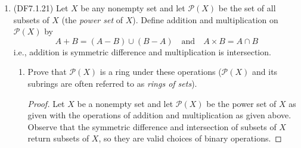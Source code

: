 \documentclass[11pt]{article}
\begin{document}
\begin{enumerate}
\begin{enumerate}[label=\textbf{(\alph*)}]
\begin{proof}
            Hence $\overline{a}\in\mathbb{Z}/n\mathbb{Z}$ is nilpotent if and only if every prime divisor of $n$ is also a divisor of $a$.
        \end{proof}

        In $\mathbb{Z}/72\mathbb{Z} = \mathbb{Z}/2^33^2\mathbb{Z}$ it follows that every nilpotent element is of the form $\overline{2^i3^ja}$ for positive integers $i,j, a$, since $2$ and $3$ divide $2^i3^j$. Explicitly, these are the elements whose integer representative is even and divisible by three; i.e., a multiple of 6: 
        \[
            \overline{0}, \overline{6}, \overline{12}, \overline{18}, \overline{24}, \overline{30}, \overline{36}, \overline{42}, \overline{48}, \overline{54}, \overline{60}, \overline{66}
        \]
        \item Let $R$ be the ring of functions from a nonempty set $X$ to a field $F$. Prove that $R$ contains no nonzero nilpotent elements.
        \begin{proof}
            Let $R$ be the ring of functions from a nonempty set $X$ to a field $F$ as given. Suppose by way of contradiction that $R$ contains a nonzero nilpotent element $g$. 
            
            Because $g$ is a nilpotent element of $R$, there exists a positive integer $k$ such that $g^k$ is the zero function $0_R\colon X\to F$ with $0_R(x) = 0_F$ for all $x\in X$.

            We have that $g$ is not the zero function $0_R$, so that there exists $y\in X$ such that $g(y)\neq 0_F$. Then $g^k(y) = [g(y)]^k = 0_F$. But $g(y)\neq 0_F$ so that $F$ contains a nonzero zero divisor, which is a contradiction.

            Hence $R$ does not contain a nonzero nilpotent element $g$.
        \end{proof}
    \end{enumerate}
    \item (DF7.1.21) Let $X$ be any nonempty set and let $\mathcal{P}(X)$ be the set of all subsets of $X$ (the \textit{power set} of $X$). Define addition and multiplication on $\mathcal{P}(X)$ by \[A+B = (A-B)\cup (B-A)\quad \text{and} \quad A\times B = A\cap B\] i.e., addition is symmetric difference and multiplication is intersection. \begin{enumerate}[label=\textbf{(\alph*)}]
        \item Prove that $\mathcal{P}(X)$ is a ring under these operations ($\mathcal{P}(X)$ and its subrings are often referred to as \textit{rings of sets}).
        \begin{proof}
            Let $X$ be a nonempty set and let $\mathcal{P}(X)$ be the power set of $X$ as given with the operations of addition and multiplication as given above. Observe that the symmetric difference and intersection of subsets of $X$ return subsets of $X$, so they are valid choices of binary operations.


\end{proof}
\end{enumerate}
\end{enumerate}
\end{document}
